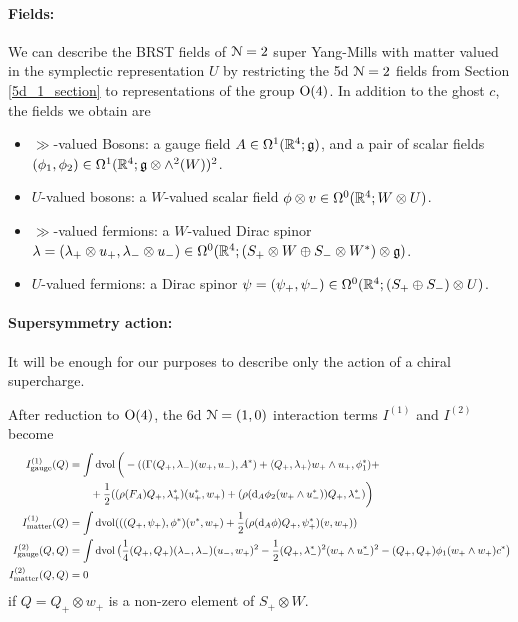 \documentclass[10pt, oneside]{article}
\begin{document}
\vspace{-10pt}
\paragraph{Fields:}  We can describe the BRST fields of $\mathcal{N}=2$ super Yang-Mills with matter valued in the symplectic representation $U$ by restricting the 5d $\mathcal{N}=2$ fields from Section \ref{5d_1_section} to representations of the group $\mathrm{O}(4)$.  In addition to the ghost $c$, the fields we obtain are
\begin{itemize}
 \item $\gg$-valued Bosons: a gauge field $A \in \Omega^1(\mathbb R^4; \mathfrak{g})$, and a pair of scalar fields $(\phi_1,\phi_2) \in \Omega^1(\mathbb R^4; \mathfrak{g} \otimes \wedge^2(W))^2$.
 \item $U$-valued bosons: a $W$-valued scalar field $\phi \otimes v \in \Omega^0(\mathbb R^4; W \otimes U)$.
 \item $\gg$-valued fermions: a $W$-valued Dirac spinor $\lambda = (\lambda_+ \otimes u_+, \lambda_-\otimes u_-) \in \Omega^0(\mathbb R^4; (S_+ \otimes W \oplus S_- \otimes W^*) \otimes \mathfrak{g})$.
 \item $U$-valued fermions: a Dirac spinor $\psi = (\psi_+,\psi_-) \in \Omega^0(\mathbb R^4; (S_+\oplus S_-) \otimes U)$.
\end{itemize}

\vspace{-10pt}
\paragraph{Supersymmetry action:} 
It will be enough for our purposes to describe only the action of a chiral supercharge.
\begin{prop} \label{4d_2_susy_action_prop}
After reduction to $\mathrm{O}(4)$, the 6d $\mathcal{N}=(1,0)$ interaction terms $I^{(1)}$ and $I^{(2)}$ become
\begin{align*}
I^{(1)}_{\mr{gauge}}(Q) &= \int \dvol \bigg(-( (\Gamma(Q_+,\lambda_-)(w_+,u_-), A^*) + \langle Q_+,\lambda_+\rangle w_+ \wedge u_+, \phi_1^* ) + \\
&\qquad  + \frac 12 ((\rho(F_A)Q_+, \lambda_+^*)(u_+^*,  w_+) + (\rho(\d_A \phi_2(w_+ \wedge u_-^*))Q_+, \lambda_-^*) \bigg)\\
I^{(1)}_{\mr{matter}}(Q) &= \int \dvol (((Q_+,\psi_+), \phi^*)(v^*,w_+) + \frac 12 (\rho(\d_A \phi)Q_+, \psi_+^*)(v,w_+)) \\
I^{(2)}_{\mr{gauge}}(Q,Q) &= \int \dvol \big(\frac 14 (Q_+,Q_+)(\lambda_-,\lambda_-)(u_-,w_+)^2 - \frac 12  (Q_+, \lambda_-^*)^2(w_+ \wedge u_-^*)^2 - (Q_+,Q_+)\phi_1(w_+ \wedge w_+)c^* \big) \\
I^{(2)}_{\mr{matter}}(Q,Q) &= 0 %
\end{align*}
if $Q=Q_+ \otimes w_+$ is a non-zero element of $S_+ \otimes W$. 
\end{prop}
\end{document}
